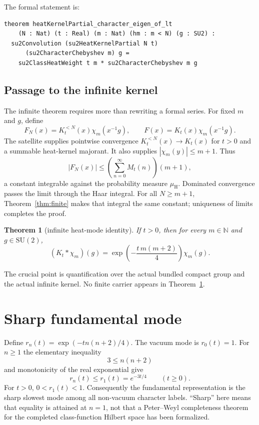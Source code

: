 \documentclass[11pt]{article}
\newtheorem{theorem}{Theorem}[section]
\theoremstyle{definition}
\theoremstyle{remark}
\newcommand{\SU}{\mathrm{SU}(2)}
\newcommand{\Haar}{\mu_{\mathrm H}}
\begin{document}
The formal statement is:
\begin{lstlisting}
theorem heatKernelPartial_character_eigen_of_lt
    (N : Nat) (t : Real) (m : Nat) (hm : m < N) (g : SU2) :
  su2Convolution (su2HeatKernelPartial N t)
      (su2CharacterChebyshev m) g =
    su2ClassHeatWeight t m * su2CharacterChebyshev m g
\end{lstlisting}

\subsection{Passage to the infinite kernel}

The infinite theorem requires more than rewriting a formal series.  For fixed
$m$ and $g$, define
\[
  F_N(x)=K_t^{<N}(x)\chi_m(x^{-1}g),\qquad
  F(x)=K_t(x)\chi_m(x^{-1}g).
\]
The satellite supplies pointwise convergence $K_t^{<N}(x)\to K_t(x)$ for
$t>0$ and a summable heat-kernel majorant.  It also supplies
$|\chi_m(y)|\le m+1$.  Thus
\[
  |F_N(x)|\le
  \left(\sum_{n=0}^{\infty}M_t(n)\right)(m+1),
\]
a constant integrable against the probability measure $\Haar$.  Dominated
convergence passes the limit through the Haar integral.  For all $N\ge m+1$,
Theorem~\ref{thm:finite} makes that integral the same constant; uniqueness of
limits completes the proof.

\begin{theorem}[infinite heat-mode identity]\label{thm:infinite}
If $t>0$, then for every $m\in\mathbb N$ and $g\in\SU$,
\[
  (K_t*\chi_m)(g)=
  \exp\!\left(-\frac{t\,m(m+2)}4\right)\chi_m(g).
\]
\end{theorem}

The crucial point is quantification over the actual bundled compact group and
the actual infinite kernel.  No finite carrier appears in
Theorem~\ref{thm:infinite}.

\section{Sharp fundamental mode}

Define $r_n(t)=\exp(-t n(n+2)/4)$.  The vacuum mode is $r_0(t)=1$.  For
$n\ge1$ the elementary inequality
\[
  3\le n(n+2)
\]
and monotonicity of the real exponential give
\[
  r_n(t)\le r_1(t)=e^{-3t/4}\qquad(t\ge0).
\]
For $t>0$, $0<r_1(t)<1$.  Consequently the fundamental representation is the
sharp slowest mode among all non-vacuum character labels.  ``Sharp'' here
means that equality is attained at $n=1$, not that a Peter--Weyl completeness
theorem for the completed class-function Hilbert space has been formalized.
\end{document}
